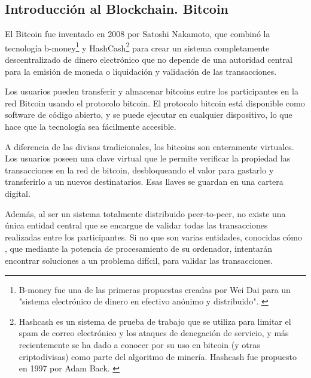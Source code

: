 \newpage

\subsection{Introducción al Blockchain. Bitcoin}

El Bitcoin fue inventado en 2008 por Satoshi Nakamoto, que combinó la tecnología b-money\footnote{B-money 
fue una de las primeras propuestas creadas por Wei Dai para un "sistema electrónico de dinero en efectivo anónimo y 
distribuido". \label{fnlabel}} y HashCash\footnote{Hashcash es un sistema de prueba de trabajo que se utiliza para 
limitar el spam de correo electrónico y los ataques de denegación de servicio, y más recientemente se ha dado a 
conocer por su uso en bitcoin (y otras criptodivisas) como parte del algoritmo de minería. Hashcash fue propuesto 
en 1997 por Adam Back. \label{fnlabel}} para crear un sistema completamente descentralizado de dinero  electrónico 
que no depende de una autoridad central para la emisión de moneda o liquidación y validación de las transacciones.

\vspace{5mm}

\noindent Los usuarios pueden transferir y almacenar bitcoins entre los participantes en la red Bitcoin usando el 
protocolo bitcoin. El protocolo bitcoin está disponible como software de código abierto, y se puede ejecutar en 
cualquier dispositivo, lo que hace que la tecnología sea fácilmente accesible.

\vspace{5mm}

\noindent A diferencia de las divisas tradicionales, los bitcoins son enteramente virtuales. Los usuarios poseen una 
clave virtual que le permite verificar la propiedad las transacciones en la red de bitcoin, desbloqueando el valor para 
gastarlo y transferirlo a un nuevos destinatarios. Esas llaves se guardan en una cartera digital. 

\vspace{5mm}

\noindent Además, al ser un sistema totalmente distribuido peer-to-peer, no existe una única entidad central que se 
encargue de validar todas las transacciones realizadas entre los participantes. Si no que son varias entidades, 
conocidas cómo , que mediante la potencia de procesamiento de su ordenador, intentarán encontrar 
soluciones a un problema difícil, para validar las transacciones.

\vspace{5mm}

